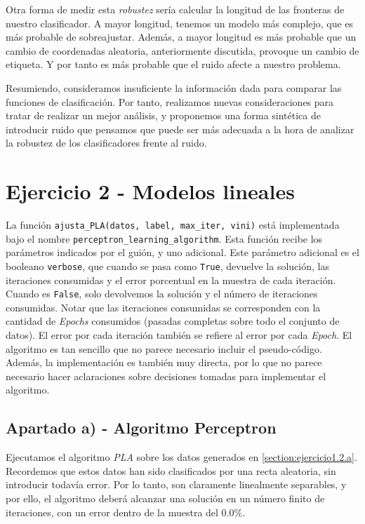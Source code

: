 \documentclass[11pt]{article}
\begin{document}
Otra forma de medir esta \emph{robustez} sería calcular la longitud de las fronteras de nuestro clasificador. A mayor longitud, tenemos un modelo más complejo, que es más probable de sobreajustar. Además, a mayor longitud es más probable que un cambio de coordenadas aleatoria, anteriormente discutida, provoque un cambio de etiqueta. Y por tanto es más probable que el ruido afecte a nuestro problema.

Resumiendo, consideramos insuficiente la información dada para comparar las funciones de clasificación. Por tanto, realizamos nuevas consideraciones para tratar de realizar un mejor análisis, y proponemos una forma sintética de introducir ruido que pensamos que puede ser más adecuada a la hora de analizar la robustez de los clasificadores frente al ruido.

\pagebreak

\section{Ejercicio 2 - Modelos lineales}

La función \lstinline{ajusta_PLA(datos, label, max_iter, vini)} está implementada bajo el nombre \lstinline{perceptron_learning_algorithm}. Esta función recibe los parámetros indicados por el guión, y uno adicional. Este parámetro adicional es el booleano \lstinline{verbose}, que cuando se pasa como \lstinline{True}, devuelve la solución, las iteraciones consumidas y el error porcentual en la muestra de cada iteración. Cuando es \lstinline{False}, solo devolvemos la solución y el número de iteraciones consumidas. Notar que las iteraciones consumidas se corresponden con la cantidad de \emph{Epochs} consumidos (pasadas completas sobre todo el conjunto de datos). El error por cada iteración también se refiere al error por cada \emph{Epoch}. El algoritmo es tan sencillo que no parece necesario incluir el pseudo-código. Además, la implementación es también muy directa, por lo que no parece necesario hacer aclaraciones sobre decisiones tomadas para implementar el algoritmo.

\subsection{Apartado a) - Algoritmo Perceptron}

Ejecutamos el algoritmo \emph{PLA} sobre los datos generados en \ref{section:ejercicio1.2.a}. Recordemos que estos datos han sido clasificados por una recta aleatoria, sin introducir todavía error. Por lo tanto, son claramente linealmente separables, y por ello, el algoritmo deberá alcanzar una solución en un número finito de iteraciones, con un error dentro de la muestra del $0.0\%$.
\end{document}
